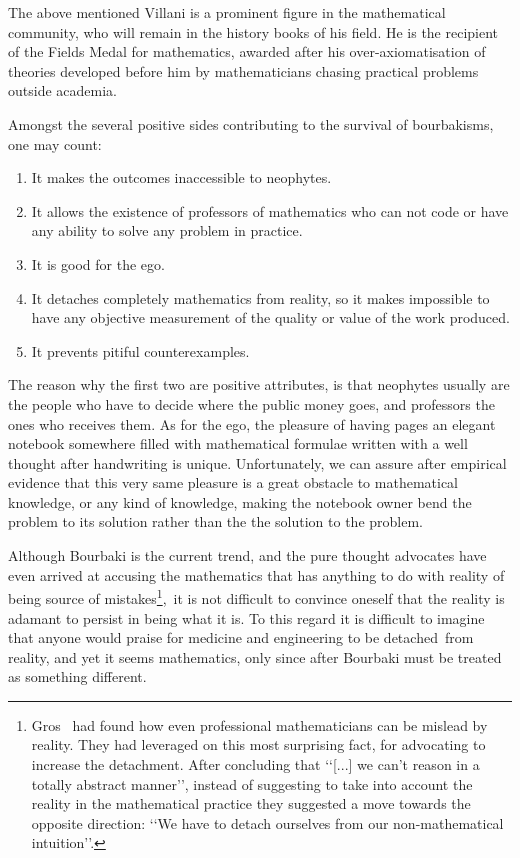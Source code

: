 \documentclass[]{scrartcl}
\begin{document}

The above mentioned Villani is a prominent figure in the mathematical community, who will remain in the history books of his field. He is the recipient of the Fields Medal for mathematics, awarded after his over-axiomatisation of theories developed before him by mathematicians chasing practical problems outside academia. 

Amongst the several positive sides contributing to the survival of bourbakisms, one may count: 
\begin{enumerate}
    \item It makes the outcomes inaccessible to neophytes.
    \item It allows the existence of professors of mathematics who can not code or have any ability to solve any problem in practice.
    \item It is good for the ego.
    \item It detaches completely mathematics from reality, so it makes impossible to have any objective measurement of the quality or value of the work produced.
    \item It prevents pitiful counterexamples.
\end{enumerate}
The reason why the first two are positive attributes, is that neophytes usually are the people who have to decide where the public money goes, and professors the ones who receives them.
As for the ego, the pleasure of having pages an elegant notebook somewhere filled with mathematical formulae written with a well thought after handwriting is unique. Unfortunately, we can assure after empirical evidence that this very same pleasure is a great obstacle to mathematical knowledge, or any kind of knowledge, making the notebook owner bend the problem to its solution rather than the the solution to the problem.

Although Bourbaki is the current trend, and the pure thought advocates have even arrived at accusing the mathematics that has anything to do with reality of being source of mistakes\footnote{
    Gros~\cite{gros2019masters} had found how even professional mathematicians can be mislead by reality. They had leveraged on this most surprising fact, for advocating to increase the detachment. After concluding that \lq\lq [...] we can't reason in a totally abstract manner\rq\rq, instead of suggesting to take into account the reality in the mathematical practice they suggested a move towards the opposite direction: \lq\lq We have to detach ourselves from our non-mathematical intuition\rq\rq.
}, it is not difficult to convince oneself that the reality is adamant to persist in being what it is. To this regard it is difficult to imagine that anyone would praise for medicine and engineering to be detached from reality, and yet it seems mathematics, only since after Bourbaki must be treated as something different.
 
\end{document}
